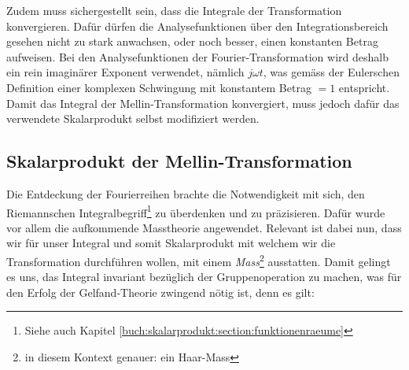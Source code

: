 Zudem muss sichergestellt sein, dass die Integrale der Transformation konvergieren.
Dafür dürfen die Analysefunktionen über den Integrationsbereich gesehen nicht zu 
stark anwachsen, oder noch besser, einen konstanten Betrag aufweisen. 
Bei den Analysefunktionen der Fourier-Transformation wird deshalb ein rein 
imaginärer Exponent verwendet, nämlich $j\omega t$, was gemäss der Eulerschen 
Definition einer komplexen Schwingung mit konstantem Betrag $= 1$ entspricht.
Damit das Integral der Mellin-Transformation konvergiert, muss jedoch dafür 
das verwendete Skalarprodukt selbst modifiziert werden.


\subsection{Skalarprodukt der Mellin-Transformation
\label{mellin:subsection:skalarprodukt}}
Die Entdeckung der Fourierreihen brachte die Notwendigkeit mit sich, den 
Riemannschen Integralbegriff\footnote{Siehe auch Kapitel 
\ref{buch:skalarprodukt:section:funktionenraeume}} zu überdenken und zu 
präzisieren.
Dafür wurde vor allem die aufkommende Masstheorie angewendet.
Relevant ist dabei nun, dass wir für unser Integral und somit Skalarprodukt 
mit welchem wir die Transformation durchführen wollen, 
mit einem {\em Mass}\footnote{in diesem Kontext genauer: ein Haar-Mass} 
ausstatten. 
Damit gelingt es uns, das Integral 
invariant bezüglich der Gruppenoperation zu machen, was für den 
Erfolg der Gelfand-Theorie zwingend nötig ist, denn es gilt:

